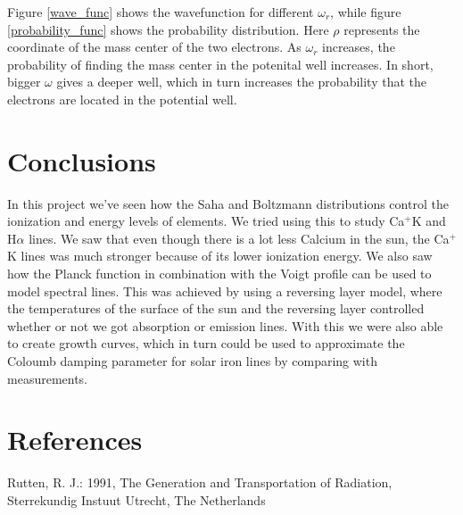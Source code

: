 \documentclass{aa}   %
\begin{document}
Figure \ref{wave_func} shows the wavefunction for different $\omega_r$, while figure \ref{probability_func} shows the probability distribution. Here $\rho$ represents the coordinate of the mass center of the two electrons. As $\omega_r$ increases, the probability of finding the mass center in the potenital well increases. In short, bigger $\omega$ gives a deeper well, which in turn increases the probability that the electrons are located in the potential well. 



\section{Conclusions} \label{sec:conclusions}
In this project we've seen how the Saha and Boltzmann distributions control the ionization and energy levels of elements. We tried using this to study Ca$^+$K and H$\alpha$ lines. We saw that even though there is a lot less Calcium in the sun, the Ca$^+$K lines was much stronger because of its lower ionization energy.
We also saw how the Planck function in combination with the Voigt profile can be used to model spectral lines. This was achieved by using a reversing layer model, where the temperatures of the surface of the sun and the reversing layer controlled whether or not we got absorption or emission lines. With this we were also able to create growth curves, which in turn could be used to approximate the Coloumb damping parameter for solar iron lines by comparing with measurements.

\section{References}
Rutten, R. J.: 1991, The Generation and Transportation of Radiation, Sterrekundig Instuut Utrecht, The Netherlands

\end{document}
